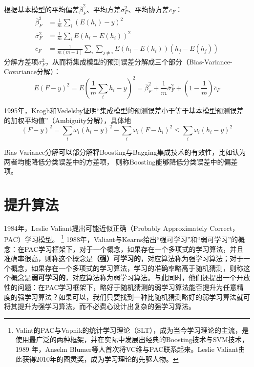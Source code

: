根据基本模型的平均偏差$\bar\beta_F^2$、平均方差$\bar\sigma_F^2$、平均协方差$\bar c_F$：
\begin{equation}\label{eq:averageq}
  \begin{array}{ll}
    \bar\beta_F^2 & =\frac{1}{m}\sum\limits_i (E(h_i) - y)^2 \\
    \bar\sigma_F^2 & =\frac{1}{m}\sum\limits_i E(h_i - E(h_i))^2\\
    \bar c_F & = \frac{1}{m(m-1)} \sum\limits_i \sum\limits_{j\neq i} E(h_i - E(h_i))(h_j - E(h_j))
  \end{array}
\end{equation}
分解方差项$\sigma_F^2$，从而将集成模型的预测误差分解成三个部分（Bias-Variance-Covariance分解）\cite{ueda1996generalization}：
\begin{equation}\label{eq:biasvariancecodec}
    E(F - y)^2 = E(\frac{1}{m} \sum\limits_i h_i - y)^2 = \bar\beta_F^2 + \frac{1}{m} \bar\sigma_F^2 + (1 - \frac{1}{m})\bar c_F
\end{equation}

1995年，Krogh和Vedelsby\cite{krogh1995neural}证明“集成模型的预测误差小于等于基本模型预测误差的加权平均值”（Ambiguity分解），具体地
\begin{equation}\label{eq:ambiguitydec}
    (F - y)^2 = \sum_i \omega_i(h_i - y)^2 - \sum_i \omega_i(F - h_i)^2 \le \sum_i \omega_i(h_i - y)^2
\end{equation}

Bias-Variance分解可以部分解释Boosting与Bagging集成技术的有效性，比如\cite{breiman1996bias}认为两者均能降低分类误差中的方差项，
\cite{freund1996experiments}则称Boosting能够降低分类误差中的偏差项。

\section{提升算法}
1984年，Leslie Valiant\cite{valiant1984theory}提出可能近似正确（Probably Approximately Correct，PAC）学习模型。
\footnote{Valint的PAC与Vapnik的统计学习理论（SLT），成为当今学习理论的主流，是使用最广泛的两种框架，并在实际中发展出经典的Boosting技术与SVM技术，1989 年，Anselm Blumer\cite{blumer1989learnability}等人首次将VC维与PAC联系起来。Leslie Valiant由此获得2010年的图灵奖，成为学习理论的先驱人物。}
1988年，Valiant与Kearns\cite{kearns1988learning}给出“强可学习”和“弱可学习”的概念：在PAC学习框架下，对于一个概念，如果存在一个多项式的学习算法，并且准确率很高，则称这个概念是\textbf{（强）可学习的}，对应算法称为强学习算法；对于一个概念，如果存在一个多项式的学习算法，学习的准确率略高于随机猜测，则称这个概念是\textbf{弱可学习的}，对应算法称为弱学习算法。与此同时，他们还提出一个开放性的问题：在PAC学习框架下，略好于随机猜测的弱学习算法能否提升为任意精度的强学习算法？如果可以，我们只要找到一种比随机猜测略好的弱学习算法就可将其提升为强学习算法，而不必费心设计出复杂的强学习算法。

